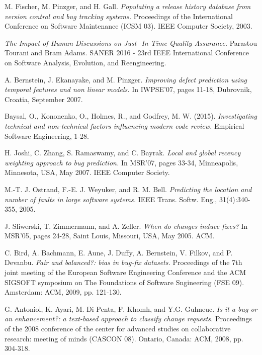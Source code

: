 \documentclass[conference,compsoc]{IEEEtran}
\begin{document}
%
%
%
\begin{thebibliography}{1}

M. Fischer, M. Pinzger, and H. Gall. \emph{Populating a
release history database from version control and bug
tracking systems.} Proceedings of the International
Conference on Software Maintenance (ICSM 03).
IEEE Computer Society, 2003.

\emph{The Impact of Human Discussions on Just -In-Time
Quality Assurance.} Parastou Tourani and Bram
Adams. SANER 2016 - 23rd IEEE International
Conference on Software Analysis, Evolution, and
Reengineering.

A. Bernstein, J. Ekanayake, and M. Pinzger.
\emph{Improving defect prediction using temporal features
and non linear models.} In IWPSE’07, pages 11-18,
Dubrovnik, Croatia, September 2007.

Baysal, O., Kononenko, O., Holmes, R., and Godfrey,
M. W. (2015). \emph{Investigating technical and
non-technical factors influencing modern code review.}
Empirical Software Engineering, 1-28.

H. Joshi, C. Zhang, S. Ramaswamy, and C. Bayrak.
\emph{Local and global recency weighting approach to bug
prediction.} In MSR’07, pages 33-34, Minneapolis,
Minnesota, USA, May 2007. IEEE Computer Society.

M.-T. J. Ostrand, F.-E. J. Weyuker, and R. M. Bell.
\emph{Predicting the location and number of faults in large 
software systems.} IEEE Trans. Softw. Eng.,
31(4):340-355, 2005.

J. Sliwerski, T. Zimmermann, and A. Zeller. \emph{When do
changes induce fixes?} In MSR’05, pages 24-28, Saint
Louis, Missouri, USA, May 2005. ACM.

C. Bird, A. Bachmann, E. Aune, J. Duffy, A.
Bernstein, V. Filkov, and P. Devanbu. \emph{Fair and
balanced?: bias in bug-fix datasets.} Proceedings of
the 7th joint meeting of the European Software
Engineering Conference and the ACM SIGSOFT
symposium on The Foundations of Software
Sngineering (FSE 09). Amsterdam:
ACM, 2009, pp. 121-130.

G. Antoniol, K. Ayari, M. Di Penta, F. Khomh, and
Y.G. Guhneuc. \emph{Is it a bug or an enhancement?: a
text-based approach to classify change requests.}
Proceedings of the 2008 conference of the center for
advanced studies on collaborative research: meeting
of minds (CASCON 08). Ontario, Canada: ACM,
2008, pp. 304-318.

\end{thebibliography}




\end{document}
